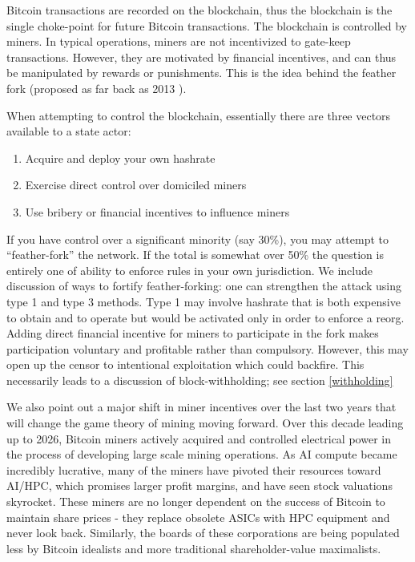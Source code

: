 \documentclass{article}%
\begin{document}
Bitcoin transactions are recorded on the blockchain, thus the blockchain is the single choke-point for future Bitcoin transactions. The blockchain
is controlled by miners. In typical operations, miners are not incentivized to gate-keep transactions.   However, they are motivated by financial incentives, and
can thus be manipulated by rewards or punishments. This is the idea behind the
feather fork (proposed as far back as 2013 \cite{Miller13}).

When attempting to control the blockchain, essentially there are three vectors available to a state actor:

\begin{enumerate}
\item Acquire and deploy your own hashrate

\item Exercise direct control over domiciled miners

\item Use bribery or financial incentives to influence miners
\end{enumerate}

If you have control over a significant
minority (say 30\%), you may attempt to ``feather-fork'' the network.  If the
total is somewhat over 50\% the question is entirely one of ability to enforce
rules in your own jurisdiction.  We include discussion of ways to fortify
feather-forking: one can strengthen the attack using type 1 and type 3 methods.
 Type 1 may involve hashrate that is both expensive to obtain and to operate but would be activated only in order to enforce a reorg.
 Adding direct financial incentive for miners to participate in the fork
makes participation voluntary and profitable rather than compulsory.
 However, this may open up the censor to intentional exploitation which could
backfire.  This necessarily leads to a discussion of block-withholding; see
section \ref{withholding}

We also point out a major shift in miner incentives over the last two years
that will change the game theory of mining moving forward.  Over this decade
leading up to 2026, Bitcoin miners actively acquired and controlled electrical power in the process of
developing large scale mining operations.  As AI compute became incredibly
lucrative, many of the miners have pivoted their resources toward AI/HPC,
which promises larger profit margins, and have seen stock valuations skyrocket.
 These miners are no longer dependent on the success of Bitcoin to maintain
share prices - they replace obsolete ASICs with HPC equipment and never
look back.  Similarly, the boards of these corporations are being populated
less by Bitcoin idealists and more traditional shareholder-value
maximalists.
\end{document}
